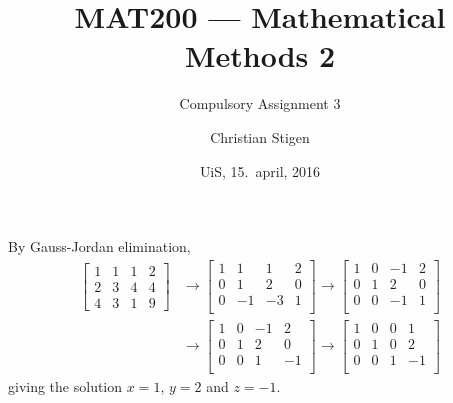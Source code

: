 \documentclass[a4paper,norsk,12pt]{article}
\title{MAT200 --- Mathematical Methods 2}
\subtitle{Compulsory Assignment 3}
\author{Christian Stigen}
\date{UiS, 15.~april, 2016}
\begin{document}
\maketitle

By Gauss-Jordan elimination,
\begin{align*}
    \left[
      \begin{array}{rrr|r}
        1 & 1 & 1 & 2 \\
        2 & 3 & 4 & 4 \\
        4 & 3 & 1 & 9
      \end{array}
    \right]
    & \rightarrow
    \left[
      \begin{array}{rrr|r}
         1 &  1 &  1 &  2 \\
         0 &  1 &  2 &  0 \\
         0 & -1 & -3 &  1 \\
      \end{array}
    \right]
    \rightarrow
    \left[
      \begin{array}{rrr|r}
         1 &  0 & -1 &  2 \\
         0 &  1 &  2 &  0 \\
         0 &  0 & -1 &  1 \\
      \end{array}
    \right]
    \\
    & \rightarrow
    \left[
      \begin{array}{rrr|r}
         1 &  0 & -1 &  2 \\
         0 &  1 &  2 &  0 \\
         0 &  0 &  1 & -1 \\
      \end{array}
    \right]
    \rightarrow
    \left[
      \begin{array}{rrr|r}
         1 &  0 &  0 &  1 \\
         0 &  1 &  0 &  2 \\
         0 &  0 &  1 & -1 \\
      \end{array}
    \right]
\end{align*}
giving the solution $x=1$, $y=2$ and $z=-1$.
\end{document}
